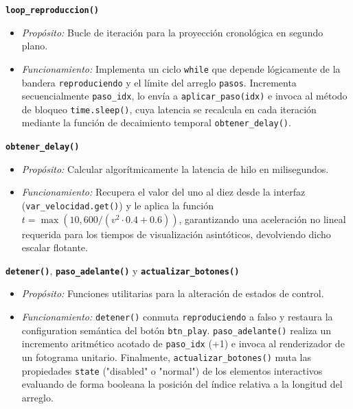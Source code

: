 \documentclass[conference]{IEEEtran}
\begin{document}
\vspace{0.2cm}
\noindent \textbf{\texttt{loop\_reproduccion()}}
\begin{itemize}
    \item \textit{Propósito:} Bucle de iteración para la proyección cronológica en segundo plano.
    \item \textit{Funcionamiento:} Implementa un ciclo \texttt{while} que depende lógicamente de la bandera \texttt{reproduciendo} y el límite del arreglo \texttt{pasos}. Incrementa secuencialmente \texttt{paso\_idx}, lo envía a \texttt{aplicar\_paso(idx)} e invoca al método de bloqueo \texttt{time.sleep()}, cuya latencia se recalcula en cada iteración mediante la función de decaimiento temporal \texttt{obtener\_delay()}.
\end{itemize}

\vspace{0.2cm}
\noindent \textbf{\texttt{obtener\_delay()}}
\begin{itemize}
    \item \textit{Propósito:} Calcular algorítmicamente la latencia de hilo en milisegundos.
    \item \textit{Funcionamiento:} Recupera el valor del uno al diez desde la interfaz (\texttt{var\_velocidad.get()}) y le aplica la función $t = \max(10, 600 / (v^2 \cdot 0.4 + 0.6))$, garantizando una aceleración no lineal requerida para los tiempos de visualización asintóticos, devolviendo dicho escalar flotante.
\end{itemize}

\vspace{0.2cm}
\noindent \textbf{\texttt{detener()}}, \textbf{\texttt{paso\_adelante()}} y \textbf{\texttt{actualizar\_botones()}}
\begin{itemize}
    \item \textit{Propósito:} Funciones utilitarias para la alteración de estados de control.
    \item \textit{Funcionamiento:} \texttt{detener()} conmuta \texttt{reproduciendo} a falso y restaura la configuration semántica del botón \texttt{btn\_play}. \texttt{paso\_adelante()} realiza un incremento aritmético acotado de \texttt{paso\_idx} (+1) e invoca al renderizador de un fotograma unitario. Finalmente, \texttt{actualizar\_botones()} muta las propiedades \texttt{state} ("disabled" o "normal") de los elementos interactivos evaluando de forma booleana la posición del índice relativa a la longitud del arreglo.
\end{itemize}
\end{document}
